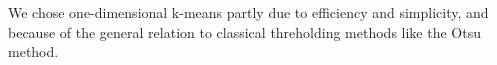 \documentclass[12pt]{spieman}  %
\begin{document}
\begin{spacing}{2}
We chose one-dimensional k-means partly due to efficiency and simplicity, and
because of the general relation to classical threholding methods like the Otsu
method\cite{liuOtsuMethodKmeans2009}.










\end{spacing}
\end{document}
